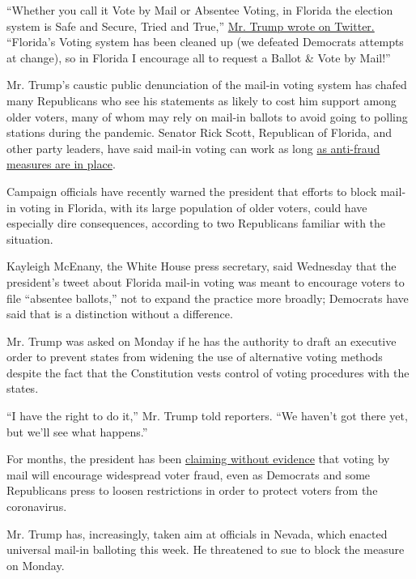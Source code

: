 ``Whether you call it Vote by Mail or Absentee Voting, in Florida the
election system is Safe and Secure, Tried and True,''
\href{https://twitter.com/realDonaldTrump/status/1290692768675901440}{Mr.
Trump wrote on Twitter.} ``Florida's Voting system has been cleaned up
(we defeated Democrats attempts at change), so in Florida I encourage
all to request a Ballot \& Vote by Mail!''

Mr. Trump's caustic public denunciation of the mail-in voting system has
chafed many Republicans who see his statements as likely to cost him
support among older voters, many of whom may rely on mail-in ballots to
avoid going to polling stations during the pandemic. Senator Rick Scott,
Republican of Florida, and other party leaders, have said mail-in voting
can work as long
\href{https://thehill.com/homenews/senate/499352-gop-senator-you-can-do-mail-in-voting-with-laws-in-place-to-limit-fraud}{as
anti-fraud measures are in place}.

Campaign officials have recently warned the president that efforts to
block mail-in voting in Florida, with its large population of older
voters, could have especially dire consequences, according to two
Republicans familiar with the situation.

Kayleigh McEnany, the White House press secretary, said Wednesday that
the president's tweet about Florida mail-in voting was meant to
encourage voters to file ``absentee ballots,'' not to expand the
practice more broadly; Democrats have said that is a distinction without
a difference.

Mr. Trump was asked on Monday if he has the authority to draft an
executive order to prevent states from widening the use of alternative
voting methods despite the fact that the Constitution vests control of
voting procedures with the states.

``I have the right to do it,'' Mr. Trump told reporters. ``We haven't
got there yet, but we'll see what happens.''

For months, the president has been
\href{https://www.nytimes3xbfgragh.onion/article/mail-in-voting-explained.html}{claiming
without evidence} that voting by mail will encourage widespread voter
fraud, even as Democrats and some Republicans press to loosen
restrictions in order to protect voters from the coronavirus.

Mr. Trump has, increasingly, taken aim at officials in Nevada, which
enacted universal mail-in balloting this week. He threatened to sue to
block the measure on Monday.

